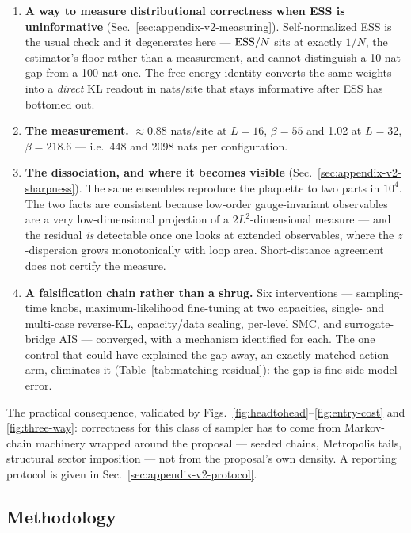 \begin{enumerate}
  \item \textbf{A way to measure distributional correctness when ESS is
    uninformative} (Sec.~\ref{sec:appendix-v2-measuring}). Self-normalized
    ESS is the usual check and it degenerates here --- ${\rm ESS}/N$ sits at
    exactly $1/N$, the estimator's floor rather than a measurement, and
    cannot distinguish a 10-nat gap from a 100-nat one. The free-energy
    identity converts the same weights into a \emph{direct} KL readout in
    nats/site that stays informative after ESS has bottomed out.
  \item \textbf{The measurement.} ${\approx}0.88$ nats/site at $L = 16$,
    $\beta = 55$ and 1.02 at $L = 32$, $\beta = 218.6$ --- i.e.\ 448 and
    2098 nats per configuration.
  \item \textbf{The dissociation, and where it becomes visible}
    (Sec.~\ref{sec:appendix-v2-sharpness}). The same ensembles reproduce the
    plaquette to two parts in $10^4$. The two facts are consistent because
    low-order gauge-invariant observables are a very low-dimensional
    projection of a $2L^2$-dimensional measure --- and the residual
    \emph{is} detectable once one looks at extended observables, where the
    $z$-dispersion grows monotonically with loop area. Short-distance
    agreement does not certify the measure.
  \item \textbf{A falsification chain rather than a shrug.} Six
    interventions --- sampling-time knobs, maximum-likelihood fine-tuning at
    two capacities, single- and multi-case reverse-KL, capacity/data
    scaling, per-level SMC, and surrogate-bridge AIS --- converged, with a
    mechanism identified for each. The one control that could have explained
    the gap away, an exactly-matched action arm, eliminates it
    (Table~\ref{tab:matching-residual}): the gap is fine-side model error.
\end{enumerate}

The practical consequence, validated by
Figs.~\ref{fig:headtohead}--\ref{fig:entry-cost} and \ref{fig:three-way}:
correctness for this class of sampler has to come from Markov-chain
machinery wrapped around the proposal --- seeded chains, Metropolis tails,
structural sector imposition --- not from the proposal's own density. A
reporting protocol is given in Sec.~\ref{sec:appendix-v2-protocol}.

\subsection{Methodology}
\label{sec:appendix-v2-methods}

